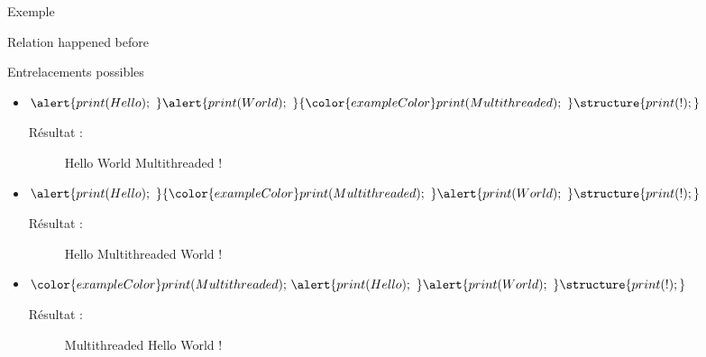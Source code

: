 
\begingroup

\begin{frame}[fragile]{Exemple}

  \begin{block}{Relation happened before}
    \begin{center}
    \end{center}
  \end{block}

  \begin{block}{Entrelacements possibles}
    \begin{itemize}
    \item $\alert{print(Hello);~ } \alert{print(World);~ } {\color{exampleColor}print(Multithreaded);~ } \structure{print(!); }$
      \begin{description}
      \item[Résultat :] Hello World Multithreaded !
      \end{description}
    \item\vspace{2mm} $\alert{print(Hello);~ } {\color{exampleColor}print(Multithreaded);~ } \alert{print(World);~ } \structure{print(!); }$
      \begin{description}
      \item[Résultat :] Hello Multithreaded World !
      \end{description}
    \item\vspace{2mm} ${\color{exampleColor}print(Multithreaded);~ } \alert{print(Hello);~ } \alert{print(World);~ } \structure{print(!); }$
      \begin{description}
      \item[Résultat :] Multithreaded Hello World !
      \end{description}
    \end{itemize}
  \end{block}

\end{frame}

\endgroup
\endinput
